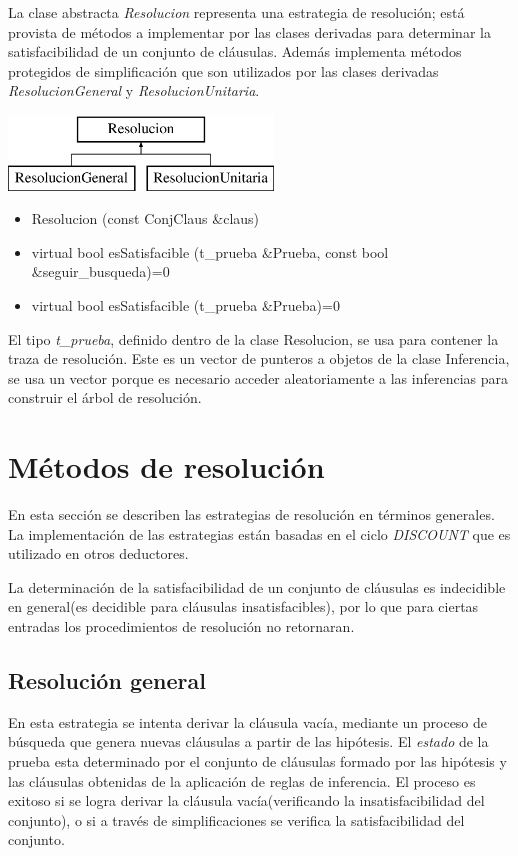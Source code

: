 \documentclass[a4paper,12pt]{article}
\begin{document}
La clase abstracta \emph{Resolucion} representa una estrategia de resolución; está provista de métodos a 
implementar por las clases derivadas para determinar la satisfacibilidad de un conjunto de cláusulas. 
Además implementa métodos protegidos de simplificación que son utilizados por las clases derivadas \emph{ResolucionGeneral}
y \emph{ResolucionUnitaria}.
\begin{center}
\leavevmode
\includegraphics[height=2cm]{imagenes/classResolucion}
\end{center}
\begin{itemize}
\renewcommand{\labelitemi}{$\bullet$}
\item Resolucion (const ConjClaus \&claus)
\item virtual bool esSatisfacible (t\_prueba \&Prueba, const bool \&seguir\_busqueda)=0
\item virtual bool esSatisfacible (t\_prueba \&Prueba)=0
\end{itemize}
El tipo \emph{t\_prueba}, definido dentro de la clase Resolucion, se usa para contener la traza de
resolución. Este es un vector de punteros a objetos de la clase Inferencia, se usa un vector porque
es necesario acceder aleatoriamente a las inferencias para construir el árbol de resolución.
\section{Métodos de resolución}
En esta sección se describen las estrategias de resolución en términos generales. La implementación
de las estrategias están basadas en el ciclo \emph{DISCOUNT}\cite{Schultz} que es utilizado
en otros deductores.

La determinación de la satisfacibilidad de un conjunto de cláusulas es indecidible en general(es decidible 
para cláusulas insatisfacibles), por lo que para ciertas entradas los
procedimientos de resolución no retornaran.
\subsection{Resolución general}
En esta estrategia se intenta derivar la cláusula vacía, mediante un proceso de búsqueda
que genera nuevas cláusulas a partir de las hipótesis. El \emph{estado} de la prueba esta
determinado por el conjunto de cláusulas formado por las hipótesis y las cláusulas obtenidas de la aplicación de 
reglas de inferencia. El proceso es exitoso si se logra derivar la cláusula
vacía(verificando la insatisfacibilidad del conjunto), o si a través de simplificaciones se verifica la satisfacibilidad del conjunto.
\end{document}
